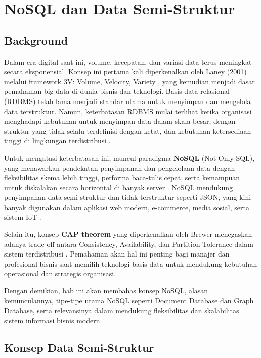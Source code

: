 \chapter{NoSQL dan Data Semi-Struktur}

\section{Background}

Dalam era digital saat ini, volume, kecepatan, dan variasi data terus meningkat secara eksponensial. Konsep ini pertama kali diperkenalkan oleh Laney (2001) melalui framework 3V: Volume, Velocity, Variety \cite{laney2001}, yang kemudian menjadi dasar pemahaman big data di dunia bisnis dan teknologi. Basis data relasional (RDBMS) telah lama menjadi standar utama untuk menyimpan dan mengelola data terstruktur. Namun, keterbatasan RDBMS mulai terlihat ketika organisasi menghadapi kebutuhan untuk menyimpan data dalam skala besar, dengan struktur yang tidak selalu terdefinisi dengan ketat, dan kebutuhan ketersediaan tinggi di lingkungan terdistribusi \cite{stonebraker2010sql, kimball2013}.

Untuk mengatasi keterbatasan ini, muncul paradigma \textbf{NoSQL} (Not Only SQL), yang menawarkan pendekatan penyimpanan dan pengelolaan data dengan fleksibilitas skema lebih tinggi, performa baca-tulis cepat, serta kemampuan untuk diskalakan secara horizontal di banyak server \cite{han2011survey}. NoSQL mendukung penyimpanan data semi-struktur dan tidak terstruktur seperti JSON, yang kini banyak digunakan dalam aplikasi web modern, e-commerce, media sosial, serta sistem IoT \cite{gandomi2015}.

Selain itu, konsep \textbf{CAP theorem} yang diperkenalkan oleh Brewer menegaskan adanya trade-off antara Consistency, Availability, dan Partition Tolerance dalam sistem terdistribusi \cite{brewer2012cap}. Pemahaman akan hal ini penting bagi manajer dan profesional bisnis saat memilih teknologi basis data untuk mendukung kebutuhan operasional dan strategis organisasi.

Dengan demikian, bab ini akan membahas konsep NoSQL, alasan kemunculannya, tipe-tipe utama NoSQL seperti Document Database dan Graph Database, serta relevansinya dalam mendukung fleksibilitas dan skalabilitas sistem informasi bisnis modern.


\section{Konsep Data Semi-Struktur}

